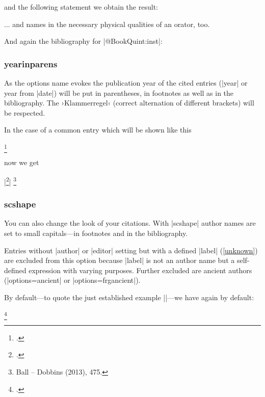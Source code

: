\documentclass[a4paper,
10pt,
greek,
french,
spanish,
italian,
ngerman,
english,
]{ltxdoc}
\begin{document}
and the following statement we obtain the result:

\begin{refsection}
\begin{example}
... and \citeauthor{Quint:inst} names in  the  necessary physical qualities of an orator, too.
\end{example}
\end{refsection}

And again the bibliography for |@Book{Quint:inst}|:

\subsubsection{yearinparens}\label{yearinparens}
%
As the options name evokes the publication year of the cited entries 
(|year| or year from |date|) will be put in parentheses,
in footnotes as well as in the bibliography. 
The ›Klammerregel‹ (correct alternation of different brackets) will be respected.

In the case of a common entry which will be shown like this
\begin{example}
\footnote{\cite[475]{Ball2013}.}
\end{example}


now we get

\begin{tcolorbox}[examplebox] 
|\footnote{\cite[475]{Ball2013}.}|
\tcblower
\footnote{Ball – Dobbins {\color{red}(}2013{\color{red})}, 475.}
\end{tcolorbox}


\subsubsection{scshape}\label{scshape}
You can also change the look of your citations. 
With |scshape| author names are set to small capitals---in footnotes and in the bibliography.

Entries without |author| or |editor| setting but with a defined
 |label| (\cref{unknown}) are excluded from this option
because |label| is not an author name but a self-defined expression with varying purposes.
Further excluded are ancient authors (|options={ancient}| or |options={frgancient}|).

By default---to quote the just established example ||---we have again by default:

\begin{example}
\footnote{\cite[475]{Ball2013}.}
\end{example}
\end{document}
